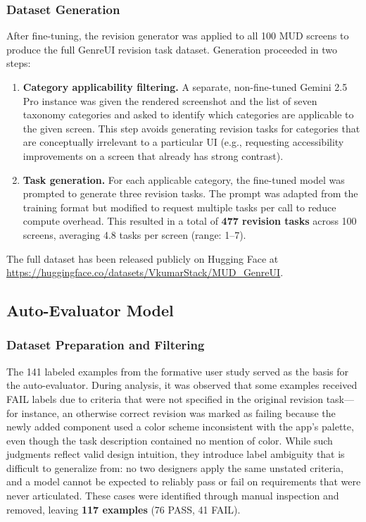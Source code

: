 \documentclass[sigconf,nonacm]{acmart}
\begin{document}
\subsubsection{Dataset Generation}

After fine-tuning, the revision generator was applied to all 100 MUD screens to produce the full GenreUI revision task dataset. Generation proceeded in two steps:

\begin{enumerate}[noitemsep]
  \item \textbf{Category applicability filtering.} A separate, non-fine-tuned Gemini 2.5 Pro instance was given the rendered screenshot and the list of seven taxonomy categories and asked to identify which categories are applicable to the given screen. This step avoids generating revision tasks for categories that are conceptually irrelevant to a particular UI (e.g., requesting accessibility improvements on a screen that already has strong contrast).
  \item \textbf{Task generation.} For each applicable category, the fine-tuned model was prompted to generate three revision tasks. The prompt was adapted from the training format but modified to request multiple tasks per call to reduce compute overhead. This resulted in a total of \textbf{477 revision tasks} across 100 screens, averaging 4.8 tasks per screen (range: 1--7).
\end{enumerate}

The full dataset has been released publicly on Hugging Face at \url{https://huggingface.co/datasets/VkumarStack/MUD_GenreUI}.

\subsection{Auto-Evaluator Model}
\label{sec:evaluator}

\subsubsection{Dataset Preparation and Filtering}
\label{sec:evaluator_filtering}

The 141 labeled examples from the formative user study served as the basis for the auto-evaluator. During analysis, it was observed that some examples received FAIL labels due to criteria that were not specified in the original revision task—for instance, an otherwise correct revision was marked as failing because the newly added component used a color scheme inconsistent with the app's palette, even though the task description contained no mention of color. While such judgments reflect valid design intuition, they introduce label ambiguity that is difficult to generalize from: no two designers apply the same unstated criteria, and a model cannot be expected to reliably pass or fail on requirements that were never articulated. These cases were identified through manual inspection and removed, leaving \textbf{117 examples} (76 PASS, 41 FAIL).
\end{document}
